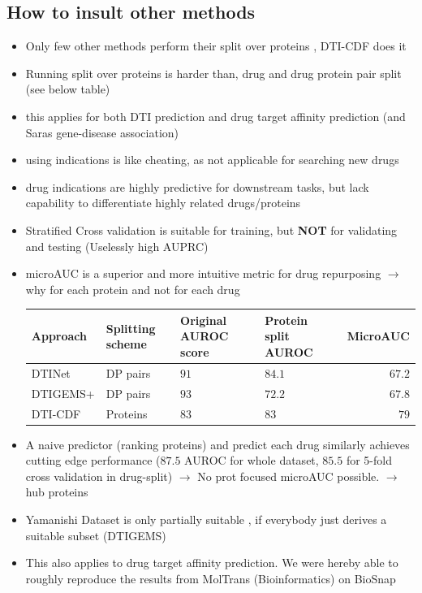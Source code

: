 \documentclass{bioinfo}
\begin{document}
\subsection{How to insult other methods}
\begin{itemize}
	\item Only few other methods perform their split over proteins \citep{Survey2018}, DTI-CDF does it
	\item Running split over proteins is harder than, drug and drug protein pair split (see below table)
	\item this applies for both DTI prediction and drug target affinity prediction (and Saras gene-disease association)
	\item using indications is like cheating, as not applicable for searching new drugs
	\item drug indications are highly predictive for downstream tasks, but lack capability to differentiate highly related drugs/proteins
	\item Stratified Cross validation is suitable for training, but \textbf{NOT} for validating and testing (Uselessly high AUPRC)
	\item microAUC is a superior and more intuitive metric for drug repurposing $\rightarrow$ why for each protein and not for each drug
	
	\begin{tabular}{|l|p{1cm}|p{1cm}|p{1cm}|r|}
		\hline
		Approach&Splitting scheme&Original AUROC score&Protein split AUROC&MicroAUC\\
		\hline
		DTINet&DP pairs&$91$&$84.1$&$67.2$\\
		DTIGEMS+&DP pairs&$93$& $72.2$& $67.8$ \\
		DTI-CDF&Proteins&$83$&$83$&$79$\\
		\hline
	\end{tabular}
	\item A naive predictor (ranking proteins) and predict each drug similarly achieves cutting edge performance ($87.5$ AUROC for whole dataset, $85.5$ for 5-fold cross validation in drug-split) $\rightarrow$ No prot focused microAUC possible. $\rightarrow$ hub proteins
	\item Yamanishi Dataset is only partially suitable , if everybody just derives a suitable subset (DTIGEMS)
	\item This also applies to drug target affinity prediction. We were hereby able to roughly reproduce the results from MolTrans (Bioinformatics) on BioSnap

\end{itemize}
\end{document}
